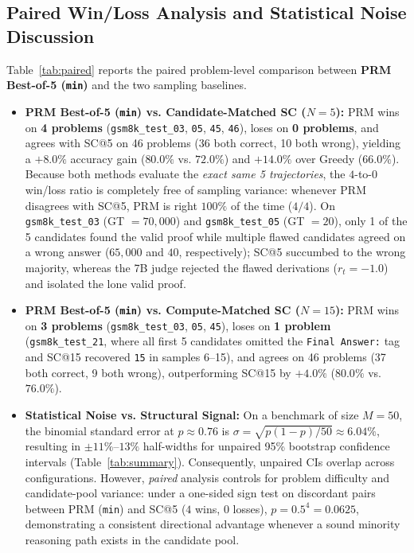 \documentclass[10pt,a4paper]{article}
\begin{document}
\subsection{Paired Win/Loss Analysis and Statistical Noise Discussion}
Table~\ref{tab:paired} reports the paired problem-level comparison between \textbf{PRM Best-of-5 (\texttt{min})} and the two sampling baselines.
\begin{itemize}
    \item \textbf{PRM Best-of-5 (\texttt{min}) vs. Candidate-Matched SC ($N=5$):} PRM wins on \textbf{4 problems} (\texttt{gsm8k\_test\_03}, \texttt{05}, \texttt{45}, \texttt{46}), loses on \textbf{0 problems}, and agrees with SC@5 on 46 problems (36 both correct, 10 both wrong), yielding a $+8.0\%$ accuracy gain ($80.0\%$ vs. $72.0\%$) and $+14.0\%$ over Greedy ($66.0\%$). Because both methods evaluate the \textit{exact same 5 trajectories}, the $4$-to-$0$ win/loss ratio is completely free of sampling variance: whenever PRM disagrees with SC@5, PRM is right $100\%$ of the time ($4/4$). On \texttt{gsm8k\_test\_03} (GT $=70{,}000$) and \texttt{gsm8k\_test\_05} (GT $=20$), only 1 of the 5 candidates found the valid proof while multiple flawed candidates agreed on a wrong answer ($65{,}000$ and $40$, respectively); SC@5 succumbed to the wrong majority, whereas the 7B judge rejected the flawed derivations ($r_t = -1.0$) and isolated the lone valid proof.
    \item \textbf{PRM Best-of-5 (\texttt{min}) vs. Compute-Matched SC ($N=15$):} PRM wins on \textbf{3 problems} (\texttt{gsm8k\_test\_03}, \texttt{05}, \texttt{45}), loses on \textbf{1 problem} (\texttt{gsm8k\_test\_21}, where all first 5 candidates omitted the \texttt{Final Answer:} tag and SC@15 recovered \texttt{15} in samples 6--15), and agrees on 46 problems (37 both correct, 9 both wrong), outperforming SC@15 by $+4.0\%$ ($80.0\%$ vs. $76.0\%$).
    \item \textbf{Statistical Noise vs. Structural Signal:} On a benchmark of size $M=50$, the binomial standard error at $p \approx 0.76$ is $\sigma = \sqrt{p(1-p)/50} \approx 6.04\%$, resulting in $\pm 11\%$--$13\%$ half-widths for unpaired 95\% bootstrap confidence intervals (Table~\ref{tab:summary}). Consequently, unpaired CIs overlap across configurations. However, \textit{paired} analysis controls for problem difficulty and candidate-pool variance: under a one-sided sign test on discordant pairs between PRM (\texttt{min}) and SC@5 ($4$ wins, $0$ losses), $p = 0.5^4 = 0.0625$, demonstrating a consistent directional advantage whenever a sound minority reasoning path exists in the candidate pool.
\end{itemize}
\end{document}
